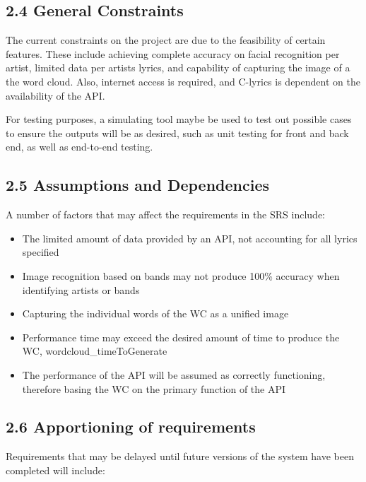 \documentclass[]{article}
\begin{document}
\subsection{2.4 General Constraints}\label{general-constraints}

The current constraints on the project are due to the feasibility of
certain features. These include achieving complete accuracy on facial
recognition per artist, limited data per artists lyrics, and capability
of capturing the image of a the word cloud. Also, internet access is
required, and C-lyrics is dependent on the availability of the API.

For testing purposes, a simulating tool maybe be used to test out
possible cases to ensure the outputs will be as desired, such as unit
testing for front and back end, as well as end-to-end testing.

\subsection{2.5 Assumptions and
Dependencies}\label{assumptions-and-dependencies}

A number of factors that may affect the requirements in the SRS include:

\begin{itemize}
\itemsep1pt\parskip0pt
\item
  The limited amount of data provided by an API, not accounting for all
  lyrics specified
\item
  Image recognition based on bands may not produce 100\% accuracy when
  identifying artists or bands
\item
  Capturing the individual words of the WC as a unified image
\item
  Performance time may exceed the desired amount of time to produce the
  WC, wordcloud\_timeToGenerate
\item
  The performance of the API will be assumed as correctly functioning,
  therefore basing the WC on the primary function of the API
\end{itemize}

\subsection{2.6 Apportioning of
requirements}\label{apportioning-of-requirements}

Requirements that may be delayed until future versions of the system
have been completed will include:
\end{document}
